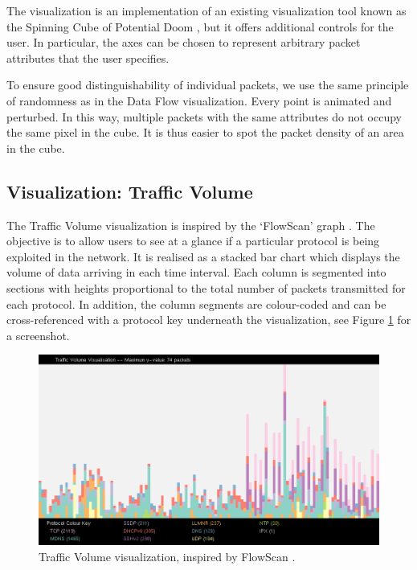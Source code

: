The visualization is an implementation of an existing visualization tool known as the Spinning Cube
of Potential Doom \cite{lau2004spinning}, but it offers additional controls for the user. In
particular, the axes can be chosen to represent arbitrary packet attributes that the user specifies.

To ensure good distinguishability of individual packets, we use the same principle of randomness as
in the Data Flow visualization. Every point is animated and perturbed. In this way, multiple packets
with the same attributes do not occupy the same pixel in the cube. It is thus easier to spot the
packet density of an area in the cube.

\subsection{Visualization: Traffic Volume}
%
The Traffic Volume visualization is inspired by the `FlowScan' graph \cite{plonka2000flowscan}. The
objective is to allow users to see at a glance if a particular protocol is being exploited in the
network. It is realised as a stacked bar chart which displays the volume of data arriving in each
time interval. Each column is segmented into sections with heights proportional to the total number
of packets transmitted for each protocol. In addition, the column segments are colour-coded and can
be cross-referenced with a protocol key underneath the visualization, see Figure
\ref{fig:traffic-volume} for a screenshot.

\begin{figure}[htb]
   \centering
   \includegraphics[width=\linewidth]{materials/traffic-volume.png}
   \caption[Traffic Volume]{\label{fig:traffic-volume}
        Traffic Volume visualization, inspired by FlowScan \cite{plonka2000flowscan}.}
\end{figure}

